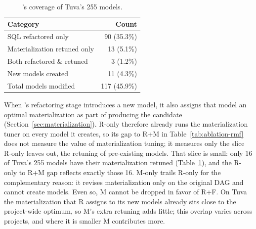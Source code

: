 
\begin{table}[tb]
\centering
\caption{\tool{}'s coverage of Tuva's 255 models. }
\inv
\label{tab:coverage}
\small
\begin{tabular}{lr}
\toprule
Category & Count \\
\midrule
SQL refactored only              & 90 (35.3\%) \\
Materialization retuned only     & 13 \phantom{(0}(5.1\%) \\
Both refactored \& retuned       &  3 \phantom{(0}(1.2\%) \\
New models created               & 11 \phantom{(0}(4.3\%) \\
\midrule
Total models modified            & 117 (45.9\%) \\
\bottomrule
\end{tabular}
\inv
\end{table}
\inv



 When \tool{}'s refactoring stage introduces a new model, it also assigns that model an optimal materialization as part of producing the candidate (Section~\ref{sec:materialization}). R-only therefore already runs the materialization tuner on every model it creates, so its gap to R+M in Table~\ref{tab:ablation-rmf} does not measure the value of materialization tuning; it measures only the slice R-only leaves out, the retuning of pre-existing models. 
That slice is small: only 16 of Tuva's 255 models have their materialization retuned (Table~\ref{tab:coverage}), and the R-only to R+M gap reflects exactly those 16. M-only trails R-only for the complementary reason: it revises materialization only on the original DAG and cannot create models. Even so, M cannot be dropped in favor of R+F. On Tuva the materialization that R assigns to its new models already sits close to the project-wide optimum, so M's extra retuning adds little; this overlap varies across projects, and where it is smaller M contributes more.






